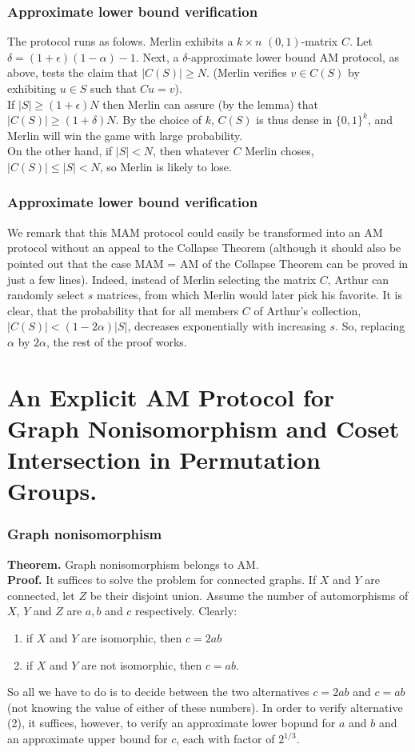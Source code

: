 \documentclass{beamer}
\begin{document}
\begin{frame}
\frametitle{Approximate lower bound verification}
The protocol runs as folows. Merlin exhibits a $k \times n$ $(0,1)$-matrix $C$. Let $\delta = (1 + \epsilon)(1 - \alpha) -1$. Next, a $\delta$-approximate lower bound AM protocol, as above, tests the claim that $|C(S)| \geq N$. (Merlin verifies $v \in C(S)$ by exhibiting $u \in S$ such that $Cu = v$).\\
If $|S| \geq (1 + \epsilon)N$ then Merlin can assure (by the lemma) that $|C(S)| \geq (1 + \delta)N$. By the choice of $k$, $C(S)$ is thus dense in $\{0, 1\}^k$, and Merlin will win the game with large probability.\\
On the other hand, if $|S| < N$, then whatever $C$ Merlin choses, $|C(S)| \leq |S| < N$, so Merlin is likely to lose.
\end{frame}

\begin{frame}
\frametitle{Approximate lower bound verification}
We remark that this MAM protocol could easily be transformed into an AM protocol without an appeal to the Collapse Theorem (although it should also be pointed out that the case MAM = AM of the Collapse Theorem can be proved in just a few lines). Indeed, instead of Merlin selecting the matrix $C$, Arthur can randomly select $s$ matrices, from which Merlin would later pick his favorite. It is clear, that the probability that for all members $C$ of Arthur's collection, $|C(S)| < (1 - 2\alpha)|S|$, decreases exponentially with increasing $s$. So, replacing $\alpha$ by $2\alpha$, the rest of the proof works.
\end{frame}

\section{An Explicit AM Protocol for Graph Nonisomorphism and Coset Intersection in Permutation Groups.}

\begin{frame}
\frametitle{Graph nonisomorphism}
\textbf{Theorem.} Graph nonisomorphism belongs to AM.\\
\textbf{Proof.} It suffices to solve the problem for connected graphs. If $X$ and $Y$ are connected, let $Z$ be their disjoint union. Assume the number of automorphisms of $X$, $Y$ and $Z$ are $a, b$ and $c$ respectively. Clearly: \begin{enumerate}
	\item if $X$ and $Y$ are isomorphic, then $c = 2ab$
	\item if $X$ and $Y$ are not isomorphic, then $c = ab$.
\end{enumerate}
So all we have to do is to decide between the two alternatives $c = 2ab$ and $c = ab$ (not knowing the value of either of these numbers). In order to verify alternative (2), it suffices, however, to verify an approximate lower bopund for $a$ and $b$ and an approximate upper bound for $c$, each with factor of $2^{1/3}$.
\end{frame}
\end{document}
